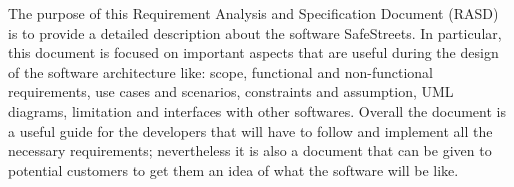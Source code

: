 The purpose of this Requirement Analysis and Specification Document (RASD)
is to provide a detailed description about the software SafeStreets.
In particular, this document is focused on important aspects that are
useful during the design of the software architecture like: scope, functional and
non-functional requirements, use cases and scenarios, constraints and assumption, UML diagrams, limitation and interfaces with other softwares.
Overall the document is a useful guide for the developers that will have to follow
and implement all the necessary requirements; nevertheless it is also a document
that can be given to potential customers to get them an idea of what the software
will be like.
